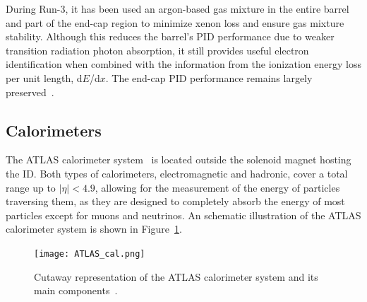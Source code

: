 During Run-3, it has been used an argon-based gas mixture in the entire barrel and part of the end-cap region to minimize xenon loss and ensure gas mixture stability. Although this reduces the barrel's PID performance due to weaker transition radiation photon absorption, it still provides useful electron identification when combined with the information from the ionization energy loss per unit length, d$E$/d$x$. The end-cap PID performance remains largely preserved~\cite{ATLAS_run3}.

\subsection{Calorimeters}
\label{sec:calo}
The ATLAS calorimeter system~\cite{2010_lar,2010_tile} is located outside the solenoid magnet hosting the ID. Both types of calorimeters, electromagnetic and hadronic, cover a total range up to $|\eta| < 4.9$, allowing for the measurement of the energy of particles traversing them, 
as they are designed to completely absorb the energy of most particles except for muons and neutrinos. An schematic illustration of the ATLAS calorimeter system is shown in Figure~\ref{fig:cal}.
\begin{figure}[htbp]
    \centering
        \texttt{[image: ATLAS\_cal.png]}
    \caption{Cutaway representation of the ATLAS calorimeter system and its main components~\cite{ATLAS_run3}.}
    \label{fig:cal}
\end{figure}

